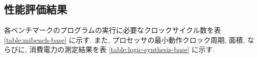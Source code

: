 \documentclass[../main.tex]{subfiles}
\begin{document}
  \subsection{性能評価結果}
  各ベンチマークのプログラムの実行に必要なクロックサイクル数を表 \ref{table:mibench-base} に示す.
  また, プロセッサの最小動作クロック周期, 面積, ならびに, 消費電力の測定結果を表 \ref{table:logic-synthesis-base} に示す.

  \begin{table}[t]
    \centering
    \caption{ベンチマークプログラムの実行クロックサイクル数(改善前)}
    \label{table:mibench-base}
  \end{table}

  \begin{table}[t]
    \centering
    \caption{論理合成の結果(改善前)}
    \label{table:logic-synthesis-base}
  \end{table}
\end{document}
